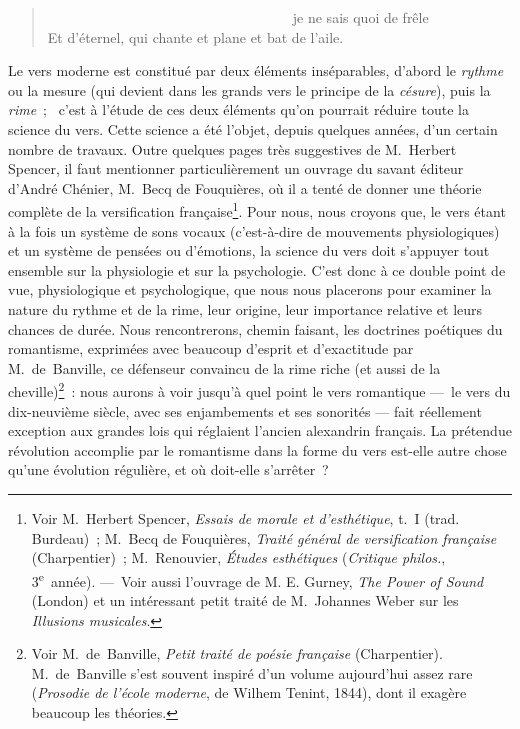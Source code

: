 \documentclass[french,twoside]{book} %
\begin{document}
\begin{verse}
                                   je ne sais quoi de frêle\\
Et d’éternel, qui chante et plane et bat de l’aile.\\
\end{verse}

\noindent Le vers moderne est constitué par deux éléments inséparables, d’abord le \emph{rythme} ou la mesure (qui devient dans  les grands vers le principe de la \emph{césure}), puis la \emph{rime} ;  c’est à l’étude de ces deux éléments qu’on pourrait réduire toute la science du vers. Cette science a été l’objet, depuis quelques années, d’un certain nombre de travaux. Outre quelques pages très suggestives de M. Herbert Spencer, il faut mentionner particulièrement un ouvrage du savant éditeur d’André Chénier, M. Becq de Fouquières, où il a tenté de donner une théorie complète de la versification française\footnote{Voir M. Herbert Spencer, \emph{Essais de morale et d’esthétique}, t. I (trad. Burdeau) ; M. Becq de Fouquières, \emph{Traité général de versification française} (Charpentier) ; M. Renouvier, \emph{Études esthétiques} (\emph{Critique philos.}, 3\textsuperscript{e} année). — Voir aussi l’ouvrage de Μ. E. Gurney, \emph{The Power of Sound} (London) et un intéressant petit traité de M. Johannes Weber sur les \emph{Illusions musicales}.}. Pour nous, nous croyons que, le vers étant à la fois un système de sons vocaux (c’est-à-dire de mouvements physiologiques) et un système de pensées ou d’émotions, la science du vers doit s’appuyer tout ensemble sur la physiologie et sur la psychologie. C’est donc à ce double point de vue, physiologique et psychologique, que nous nous placerons pour examiner la nature du rythme et de la rime, leur origine, leur importance relative et leurs chances de durée. Nous rencontrerons, chemin faisant, les doctrines poétiques du romantisme, exprimées avec beaucoup d’esprit et d’exactitude par M. de Banville, ce défenseur convaincu de la rime riche (et aussi de la cheville)\footnote{Voir M. de Banville, \emph{Petit traité de poésie française} (Charpentier). M. de Banville s’est souvent inspiré d’un volume aujourd’hui assez rare (\emph{Prosodie de l’école moderne}, de Wilhem Tenint, 1844), dont il exagère beaucoup les théories.} : nous aurons à voir jusqu’à quel point le vers romantique  — le vers du dix-neuvième siècle, avec ses enjambements et ses sonorités — fait réellement exception aux grandes lois qui réglaient l’ancien alexandrin français. La prétendue révolution accomplie par le romantisme dans la forme du vers est-elle autre chose qu’une évolution régulière, et où doit-elle s’arrêter ?\par
\end{document}
